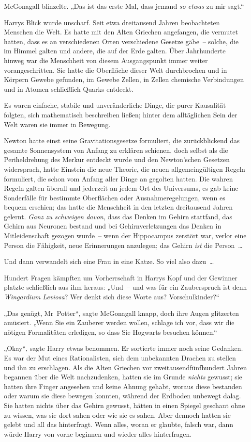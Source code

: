 McGonagall blinzelte. „Das ist das erste Mal, dass jemand \emph{so etwas} zu mir sagt.“

Harrys Blick wurde unscharf. Seit etwa dreitausend Jahren beobachteten Menschen die Welt. Es hatte mit den Alten Griechen angefangen, die vermutet hatten, dass es an verschiedenen Orten verschiedene Gesetze gäbe – solche, die im Himmel galten und andere, die auf der Erde galten. Über Jahrhunderte hinweg war die Menschheit von diesem Ausgangspunkt immer weiter vorangeschritten. Sie hatte die Oberfläche dieser Welt durchbrochen und in Körpern Gewebe gefunden, im Gewebe Zellen, in Zellen chemische Verbindungen und in Atomen schließlich Quarks entdeckt.

Es waren einfache, stabile und unveränderliche Dinge, die purer Kausalität folgten, sich mathematisch beschreiben ließen; hinter dem alltäglichen Sein der Welt waren sie immer in Bewegung.

Newton hatte einst seine Gravitationsgesetze formuliert, die zurückblickend das gesamte Sonnensystem von Anfang zu erklären schienen, doch selbst als die Periheldrehung des Merkur entdeckt wurde und den Newton’schen Gesetzen widersprach, hatte Einstein die neue Theorie, die neuen allgemeingültigen Regeln formuliert, die schon vom Anfang aller Dinge an gegolten hatten. Die wahren Regeln galten überall und jederzeit an jedem Ort des Universums, es gab keine Sonderfälle für bestimmte Oberflächen oder Ausnahmeregelungen, wenn es bequem erschien; das hatte die Menschheit in den letzten dreitausend Jahren gelernt. \emph{Ganz zu schweigen davon}, dass das Denken im Gehirn stattfand, das Gehirn aus Neuronen bestand und bei Gehirnverletzungen das Denken in Mitleidenschaft gezogen wurde – wenn der Hippocampus zerstört war, verlor eine Person die Fähigkeit, neue Erinnerungen anzulegen; das Gehirn \emph{ist} die Person …

Und dann verwandelt sich eine Frau in eine Katze. So viel also dazu …

Hundert Fragen kämpften um Vorherrschaft in Harrys Kopf und der Gewinner platzte schließlich aus ihm heraus: „Und – und was für ein Zauberspruch ist denn \emph{Wingardium Leviosa}? Wer denkt sich diese Worte aus? Vorschulkinder?“

„Das genügt, Mr~Potter“, sagte McGonagall knapp, doch ihre Augen glitzerten amüsiert. „Wenn Sie ein Zauberer werden wollen, schlage ich vor, dass wir die nötigen Formalitäten erledigen, so dass Sie Hogwarts besuchen können.“

„Okay“, sagte Harry etwas benommen. Er sortierte immer noch seine Gedanken. Es war der Mut eines Rationalisten, sich dem unbekannten Drachen zu stellen und ihn zu erschlagen. Als die Alten Griechen vor zweitausendfünfhundert Jahren begannen über die Welt nachzudenken, hatten sie im Grunde \emph{nichts} gewusst; sie hatten ihre Finger angesehen und keine Ahnung gehabt, woraus diese bestanden oder warum sie diese bewegen konnten, während der Erdboden unbewegt dalag. Sie hatten nichts über das Gehirn gewusst, hätten in einen Spiegel geschaut ohne zu wissen, was sie dort sahen oder wie sie es sahen. Aber dennoch hatten sie gelebt und all das hinterfragt. Wenn alles, woran er glaubte, falsch war, dann würde Harry von vorne beginnen und wieder alles hinterfragen.

